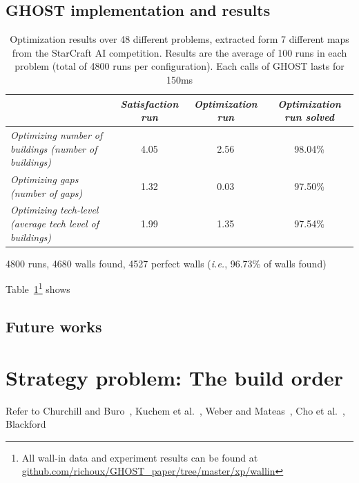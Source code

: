 \documentclass[journal]{IEEEtran}
\newcommand{\ghost}{\textsc{GHOST}\xspace}
\newcommand{\ie}{\textit{i.e.}}
\begin{document}
\subsection{\ghost implementation and results}
\begin{table}[ht]
    \caption{Optimization   results   over  48   different   problems,
      extracted  form   7  different   maps  from  the   StarCraft  AI
      competition. Results are the average of 100 runs in each problem
      (total of  4800 runs  per configuration).  Each calls  of \ghost
      lasts for 150ms}
    \label{tab:wall}
    \centering
    \begin{tabular}{|l|c|c|c|}
      \cline{2-4}
      \multicolumn{1}{c|}{} & {\em Satisfaction run}& {\em Optimization run}& {\em Optimization run solved} \\
      \hline
      {\em Optimizing number of buildings (number of buildings)} 	& 4.05                  & 2.56                  & 98.04\% \\ 
      {\em Optimizing gaps (number of gaps)} 				& 1.32                  & 0.03                  & 97.50\%  \\ 
      {\em Optimizing tech-level (average tech level of buildings)} 	& 1.99                  & 1.35                 & 97.54\%  \\
      \hline
    \end{tabular}  
\end{table}
4800 runs, 4680 walls found, 4527 perfect walls (\ie, 96.73\% of walls
found)

Table~\ref{tab:wall}\footnote{All wall-in data  and experiment results
  can                   be                  found                   at
  \href{https://github.com/richoux/GHOST\_paper/tree/master/xp/wallin}{github.com/richoux/GHOST\_paper/tree/master/xp/wallin}}
shows

\subsection{Future works}


\section{Strategy problem: The build order}\label{sec:bo}

Refer   to   Churchill   and   Buro~\cite{ChurchillB11},   Kuchem   et
al.~\cite{KuchemPR13},  Weber   and  Mateas~\cite{WeberM09},   Cho  et
al.~\cite{ChoKC13}, Blackford~\cite{Blackford14}
\end{document}
